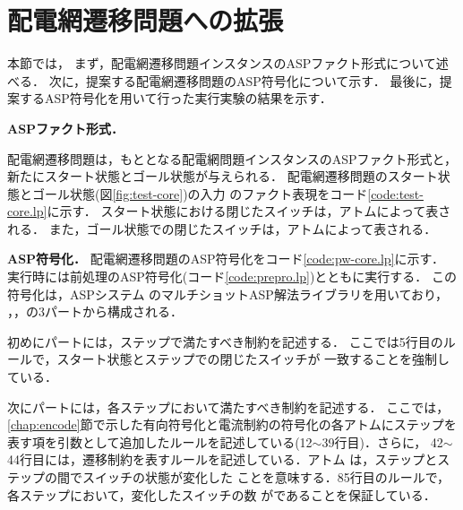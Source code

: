 \section{配電網遷移問題への拡張}\label{chap:core}

本節では，
まず，配電網遷移問題インスタンスのASPファクト形式について述べる．
次に，提案する配電網遷移問題のASP符号化について示す．
最後に，提案するASP符号化を用いて行った実行実験の結果を示す．



\textbf{ASPファクト形式．}

%
配電網遷移問題は，もととなる配電網問題インスタンスのASPファクト形式と，
新たにスタート状態とゴール状態が与えられる．
配電網遷移問題のスタート状態とゴール状態(図\ref{fig:test-core})の入力
のファクト表現をコード\ref{code:test-core.lp}に示す．
スタート状態における閉じたスイッチは，アトムによって表される．
また，ゴール状態での閉じたスイッチは，アトムによって表される．

\textbf{ASP符号化．}
%
配電網遷移問題のASP符号化をコード\ref{code:pw-core.lp}に示す．
実行時には前処理のASP符号化(コード\ref{code:prepro.lp})とともに実行する．
この符号化は，ASPシステム \clingo のマルチショットASP解法ライブラリを用いており，
，，の3パートから構成される．


初めにパートには，ステップで満たすべき制約を記述する．
ここでは5行目のルールで，スタート状態とステップでの閉じたスイッチが
一致することを強制している．

次にパートには，各ステップにおいて満たすべき制約を記述する．
ここでは，\ref{chap:encode}節で示した有向符号化と電流制約の符号化の各アトムにステップを
表す項を引数として追加したルールを記述している(12$\sim$39行目)．さらに，
42$\sim$44行目には，遷移制約を表すルールを記述している．アトム
は，ステップとステップの間でスイッチの状態が変化した
ことを意味する．85行目のルールで，各ステップにおいて，変化したスイッチの数
がであることを保証している．

